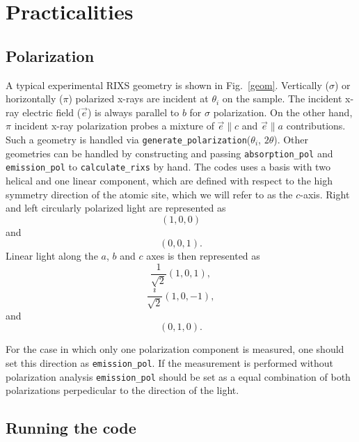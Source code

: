 \documentclass[aps,onecolumn, notitlepage, longbibliography]{revtex4-1}
\begin{document}
\section{Practicalities}

\subsection{Polarization}

A typical experimental RIXS geometry is shown in Fig.~\ref{geom}. Vertically ($\sigma$) or horizontally ($\pi$) polarized x-rays are incident at $\theta_i$ on the sample. The incident x-ray electric field ($\vec{e}$) is always parallel to $b$ for $\sigma$ polarization. On the other hand, $\pi$ incident x-ray polarization probes a mixture of $\vec{e} \parallel c$ and $\vec{e}\parallel a$ contributions.  Such a geometry is handled via \texttt{generate\_polarization}($\theta_i$, $2\theta$). Other geometries can be handled by constructing and passing \texttt{absorption\_pol} and \texttt{emission\_pol} to 
\texttt{calculate\_rixs} by hand. The codes uses a basis with two helical and one linear component, which are defined with respect to the high symmetry direction of the atomic site, which we will refer to as the $c$-axis. Right and left circularly polarized light are represented as
\begin{equation}
(1, 0, 0)
\end{equation}
and
\begin{equation}
(0, 0, 1).
\end{equation}
Linear light along the $a$, $b$ and $c$ axes is then represented as
\begin{equation}
\frac{1}{\sqrt{2}}(1, 0, 1), 
\end{equation}
\begin{equation}
\frac{i}{\sqrt{2}}(1, 0, -1),
\end{equation}
and
\begin{equation}
(0, 1, 0).
\end{equation}

For the case in which only one polarization component is measured, one should set this direction as \texttt{emission\_pol}. If the measurement is performed without polarization analysis \texttt{emission\_pol} should be set as a equal combination of both polarizations perpedicular to the direction of the light. 

\subsection{Running the code}
\end{document}
